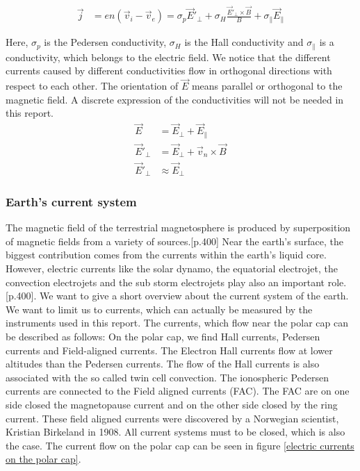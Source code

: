 \documentclass[10pt,a4paper]{article}
\begin{document}
\begin{align}
\vec{j}&= e n ( \vec{v}_i - \vec{v}_e ) = \sigma_p \vec{E}'_{\perp} + \sigma_H \frac{\vec{E}'_{\perp} \times \vec{B}}{B} + \sigma_{\parallel} \vec{E}_{\parallel}
\end{align}

Here, $\sigma_p$ is the Pedersen conductivity, $\sigma_H$ is the Hall conductivity and $\sigma_{\parallel}$ is a conductivity, which belongs to 
the electric field. We notice that the different currents caused by different conductivities flow in orthogonal directions with respect to each other. The orientation of $\vec{E}$ means parallel or orthogonal to the magnetic field. A discrete expression of the conductivities will not be needed in this report. 
\begin{align}
\vec{E}&= \vec{E}_{\perp} +\vec{E}_{\parallel}\\
\vec{E}'_{\perp}&=\vec{E}_{\perp}+ \vec{v}_n \times \vec{B}\\
\vec{E}'_{\perp}& \approx \vec{E}_{\perp}
\end{align}

\subsubsection{Earth's current system \label{_CHAP_THEO_currentsystem earth}}

The magnetic field of the terrestrial magnetosphere is produced by superposition of magnetic fields from a variety of sources.\cite{Buch2}[p.400]
Near the earth's surface, the biggest contribution comes from the currents within the earth's liquid core. However, electric currents like the solar dynamo, the equatorial electrojet, the convection electrojets and the sub storm electrojets play also an important role. \cite{Buch2}[p.400]. 
We want to give a short overview about the current system of the earth. We want to limit us to currents, which can actually be measured by the instruments used 
in this report. The currents, which flow near the polar cap can be described as follows:
On the polar cap, we find Hall currents, Pedersen currents and Field-aligned currents. 
The Electron Hall currents flow at lower altitudes than the Pedersen currents. The flow of the Hall currents is also associated with the so called twin cell convection.
The ionospheric Pedersen currents are connected to the Field aligned currents (FAC). The FAC are on one side closed the magnetopause current and on the other
side closed by the ring current. These field aligned currents were discovered by a Norwegian scientist, Kristian Birkeland in 1908. All current systems must to be closed, 
which is also the case. The current flow on the polar cap can be seen in figure \ref{electric currents on the polar cap}.
\end{document}
